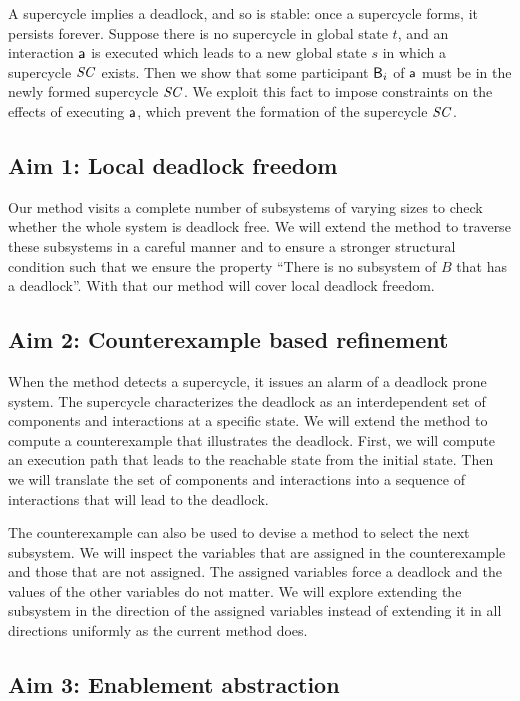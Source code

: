 A supercycle implies a deadlock, and so is stable: once a supercycle forms, it persists forever.
Suppose there is no supercycle in global state $t$, and an interaction $\mathsf{a}$ is executed which leads to a new global state $s$ in which a supercycle $\mathit{SC}$
exists. 
Then we show that some participant $\mathsf{B}_i$ of $\mathsf{a}$ must be in the newly formed supercycle $\mathit{SC}$. 
We exploit this fact to impose constraints on the effects of executing $\mathsf{a}$, which prevent the formation of the supercycle $\mathit{SC}$.

\subsection{Aim 1: Local deadlock freedom} 

Our method visits a complete number of 
subsystems of varying sizes to check whether
the whole system is deadlock free. 
We will extend the method to traverse these subsystems
in a careful manner and to ensure a stronger structural 
condition such that we ensure the property 
``There is no subsystem of $B$ that has a deadlock''. 
With that our method will cover local deadlock freedom. 

\subsection{Aim 2: Counterexample based refinement} 

When the method detects a supercycle, it issues an alarm of a 
deadlock prone system. 
The supercycle characterizes the deadlock as an interdependent 
set of components and interactions
at a specific state. 
We will extend the method to compute a counterexample
that illustrates the deadlock. 
First, we will compute an execution path that leads 
to the reachable state from the initial state. 
Then we will translate the set of components and interactions
into a sequence of interactions that will lead to the deadlock. 

The counterexample can also be used to devise a method to
select the next subsystem. 
We will inspect the variables that are assigned
in the counterexample and those that are not assigned. 
The assigned variables force a deadlock and the values of the
other variables do not matter. 
We will explore extending the subsystem in the direction of 
the assigned 
variables instead of extending it in all directions uniformly 
as the current method does. 

\subsection{Aim 3: Enablement abstraction } 

